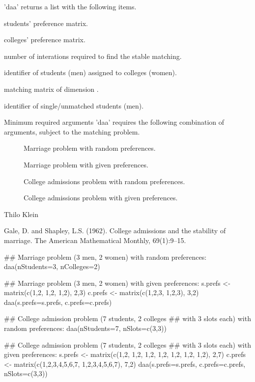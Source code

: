 \documentclass[letterpaper]{book}
\begin{document}
%
\begin{Value}
'daa' returns a list with the following items.
\begin{ldescription}
\item[\code{s.prefs}] students' preference matrix.
\item[\code{c.prefs}] colleges' preference matrix.
\item[\code{iterations}] number of interations required to find
the stable matching.\item[\code{matches}] identifier of
students (men) assigned to colleges (women).
\item[\code{match.mat}] matching matrix of dimension
.\item[\code{singles}] identifier
of single/unmatched students (men).
\end{ldescription}
\end{Value}
%
\begin{Section}{Minimum required arguments}
'daa' requires the following combination of arguments,
subject to the matching problem. \begin{description}

\item[] Marriage problem with
random preferences.\item[] Marriage problem with given preferences.
\item[] College admissions
problem with random preferences.\item[] College admissions problem with given
preferences.
\end{description}

\end{Section}
%
\begin{Author}\relax
Thilo Klein 
\end{Author}
%
\begin{References}\relax
Gale, D. and Shapley, L.S. (1962). College admissions and
the stability of marriage. The American Mathematical
Monthly, 69(1):9--15.
\end{References}
%
\begin{Examples}
\begin{ExampleCode}
## Marriage problem (3 men, 2 women) with random preferences:
daa(nStudents=3, nColleges=2)

## Marriage problem (3 men, 2 women) with given preferences:
s.prefs <- matrix(c(1,2, 1,2, 1,2), 2,3)
c.prefs <- matrix(c(1,2,3, 1,2,3), 3,2)
daa(s.prefs=s.prefs, c.prefs=c.prefs)

## College admission problem (7 students, 2 colleges
## with 3 slots each) with random preferences:
daa(nStudents=7, nSlots=c(3,3))

## College admission problem (7 students, 2 colleges
## with 3 slots each) with given preferences:
s.prefs <- matrix(c(1,2, 1,2, 1,2, 1,2, 1,2, 1,2, 1,2), 2,7)
c.prefs <- matrix(c(1,2,3,4,5,6,7, 1,2,3,4,5,6,7), 7,2)
daa(s.prefs=s.prefs, c.prefs=c.prefs, nSlots=c(3,3))
\end{ExampleCode}
\end{Examples}
\end{document}
